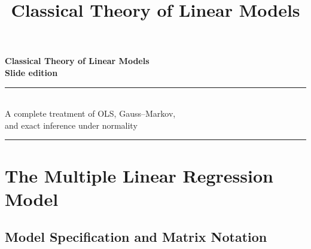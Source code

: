 \documentclass[14pt]{extarticle}
\title{\color{hdrBG}\bfseries\Huge Classical Theory of Linear Models}
\author{}
\date{}
\theoremstyle{plain}
\theoremstyle{definition}
\theoremstyle{remark}
\begin{document}
\begin{titlepage}
\thispagestyle{empty}
\vspace*{\fill}
\begin{center}
{\color{hdrBG}\bfseries\fontsize{36}{44}\selectfont Classical Theory of Linear Models}\\[1.2em]
{\color{accent}\bfseries\Large Slide edition}\\[2em]
\rule{60mm}{0.8pt}\\[1em]
{\large A complete treatment of OLS, Gauss--Markov,\\[0.2em] and exact inference under normality}\\[2em]
\rule{60mm}{0.8pt}
\end{center}
\vspace*{\fill}
\end{titlepage}

\section{The Multiple Linear Regression Model}

\subsection{Model Specification and Matrix Notation}
\end{document}

